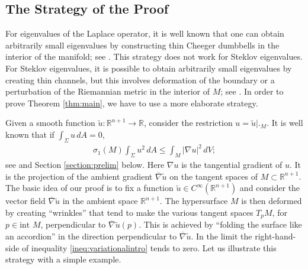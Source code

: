 \documentclass{CUP-JNL-FMP}%
\theoremstyle{definition}
\numberwithin{equation}{section}
\begin{document}
\vspace*{-10pt}%
\subsection{The Strategy of the Proof}
For eigenvalues of the Laplace operator, it is well known that one can obtain arbitrarily small eigenvalues by constructing thin Cheeger dumbbells in the interior of the manifold; see \cite{Chavel,CoursColboisMtl}. This strategy does not work for Steklov eigenvalues. For Steklov eigenvalues, it is possible to obtain arbitrarily small eigenvalues by creating thin channels, but this involves deformation of the boundary or a perturbation of the Riemannian metric in the interior of $M$; see \cite{GP10,CESG17}. In order to prove Theorem \ref{thm:main}, we have to use a more elaborate strategy.

Given a smooth function $\widetilde{u}\colon \mathbb{R}^{n+1}\rightarrow\mathbb{R}$, consider the restriction $u=\widetilde{u}\bigl|\bigr._{{M}}$.
It is well known that if $\int_{\Sigma}u\,dA=0$,
\begin{gather}\label{ineq:variationalintro}
\sigma_1(M)\int_{\Sigma}u^2\,dA\leq\int_M|\nabla u|^2\,dV;
\end{gather}
see \cite{GP17} and Section \ref{section:prelim} below. Here $\nabla u$ is the tangential gradient of $u$. It is the projection of the ambient gradient $\overline{\nabla}\widetilde{u}$ on the tangent spaces of $M\subset\mathbb{R}^{n+1}$. The basic idea of our proof is to fix a function $\widetilde{u}\in C^\infty(\mathbb{R}^{n+1})$ and consider the vector field $\overline{\nabla}\widetilde{u}$ in the ambient space $\mathbb{R}^{n+1}$. The hypersurface $M$ is then deformed by creating ``wrinkles''  that tend to make the various tangent spaces $T_pM$, for $p\in\mbox{int }M$, perpendicular to $\overline{\nabla}\widetilde{u}(p)$. This is achieved by ``folding the surface like an accordion'' in the direction perpendicular to $\overline{\nabla}\widetilde{u}$. In the limit the right-hand-side of inequality \eqref{ineq:variationalintro} tends to zero.
Let us illustrate this strategy with a simple example.
\end{document}
